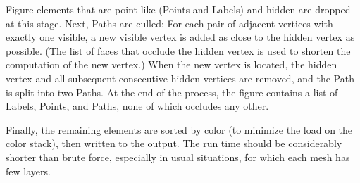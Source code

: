 \documentclass[12pt]{article}
\newcommand{\Class}[1]{\textbf{#1}}
\newcommand{\Label}{\Class{Label}}
\newcommand{\Labels}{\Class{Label}s}
\newcommand{\Mesh}{\Class{Mesh}}
\newcommand{\Meshes}{\Class{Mesh}es}
\newcommand{\Path}{\Class{Path}}
\newcommand{\Paths}{\Class{Path}s}
\newcommand{\Picture}{\Class{Picture}}
\begin{document}
Figure elements that are point-like (Points and Labels) and hidden are
dropped at this stage. Next, Paths are culled: For each pair of
adjacent vertices with exactly one visible, a new visible vertex is
added as close to the hidden vertex as possible. (The list of faces
that occlude the hidden vertex is used to shorten the computation of
the new vertex.) When the new vertex is located, the hidden vertex
and all subsequent consecutive hidden vertices are removed, and the
Path is split into two Paths. At the end of the process, the figure
contains a list of Labels, Points, and Paths, none of which occludes
any other. 

Finally, the remaining elements are sorted by color (to minimize the
load on the color stack), then written to the output. The run time
should be considerably shorter than brute force, especially in usual
situations, for which each mesh has few layers.

\end{document}
